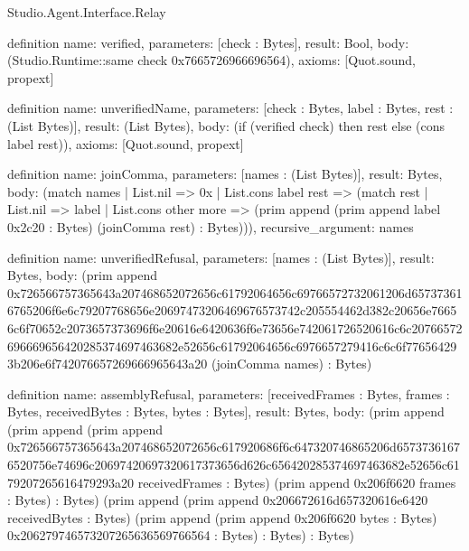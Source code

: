 \begin{lexlean}{Studio.Agent.Interface.Relay}
\begin{semanticmodule}
definition{
  name: verified,
  parameters: [check : Bytes],
  result: Bool,
  body: (Studio.Runtime::same check 0x7665726966696564),
  axioms: [Quot.sound, propext]
}

definition{
  name: unverifiedName,
  parameters: [check : Bytes, label : Bytes, rest : (List Bytes)],
  result: (List Bytes),
  body: (if (verified check) then rest else (cons label rest)),
  axioms: [Quot.sound, propext]
}

definition{
  name: joinComma,
  parameters: [names : (List Bytes)],
  result: Bytes,
  body: (match names
    | List.nil => 0x
    | List.cons label rest => (match rest
      | List.nil => label
      | List.cons other more => (prim append (prim append label 0x2c20 : Bytes) (joinComma rest) : Bytes))),
  recursive_argument: names
}

definition{
  name: unverifiedRefusal,
  parameters: [names : (List Bytes)],
  result: Bytes,
  body: (prim append 0x726566757365643a207468652072656c61792064656c69766572732061206d657373616765206f6e6c79207768656e20697473206469676573742c205554462d382c20656e76656c6f70652c2073657373696f6e20616e6420636f6e73656e742061726520616c6c20766572696669656420285374697463682e52656c61792064656c6976657279416c6c6f776564293b206e6f742076657269666965643a20 (joinComma names) : Bytes)
}

definition{
  name: assemblyRefusal,
  parameters: [receivedFrames : Bytes, frames : Bytes, receivedBytes : Bytes, bytes : Bytes],
  result: Bytes,
  body: (prim append (prim append (prim append 0x726566757365643a207468652072656c617920686f6c647320746865206d65737361676520756e74696c20697420697320617373656d626c656420285374697463682e52656c6179207265616479293a20 receivedFrames : Bytes) (prim append 0x206f6620 frames : Bytes) : Bytes) (prim append (prim append 0x206672616d657320616e6420 receivedBytes : Bytes) (prim append (prim append 0x206f6620 bytes : Bytes) 0x206279746573207265636569766564 : Bytes) : Bytes) : Bytes)
}


\end{semanticmodule}
\end{lexlean}
